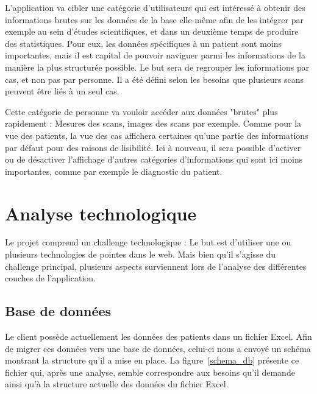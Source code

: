 		L'application va cibler une catégorie d'utilisateurs qui est intéressé à obtenir des informations brutes sur les données de la base elle-même afin de les intégrer par exemple au sein d'études scientifiques, et dans un deuxième temps de produire des statistiques. Pour eux, les données spécifiques à un patient sont moins importantes, mais il est capital de pouvoir naviguer parmi les informations de la manière la plus structurée possible. Le but sera de regrouper les informations par cas, et non pas par personne. Il a été défini selon les besoins que plusieurs scans peuvent être liés à un seul cas.

		Cette catégorie de personne va vouloir accéder aux données "brutes" plus rapidement : Mesures des scans, images des scans par exemple. Comme pour la vue des patients, la vue des cas affichera certaines qu'une partie des informations par défaut pour des raisons de lisibilité. Ici à nouveau, il sera possible d'activer ou de désactiver l'affichage d'autres catégories d'informations qui sont ici moins importantes, comme par exemple le diagnostic du patient.

\section{Analyse technologique}

	Le projet comprend un challenge technologique : Le but est d'utiliser une ou plusieurs technologies de pointes dans le web. Mais bien qu'il s'agisse du challenge principal, plusieurs aspects surviennent lors de l'analyse des différentes couches de l'application.

	\subsection{Base de données}

		Le client possède actuellement les données des patients dans un fichier
		Excel. Afin de migrer ces données vers une base de données, celui-ci
		nous a envoyé un schéma montrant la structure qu'il a mise en place. La
		figure~\ref{schema_db} présente ce fichier qui, après une analyse,
		semble correspondre aux besoins qu'il demande ainsi qu'à la structure
		actuelle des données du fichier Excel.

